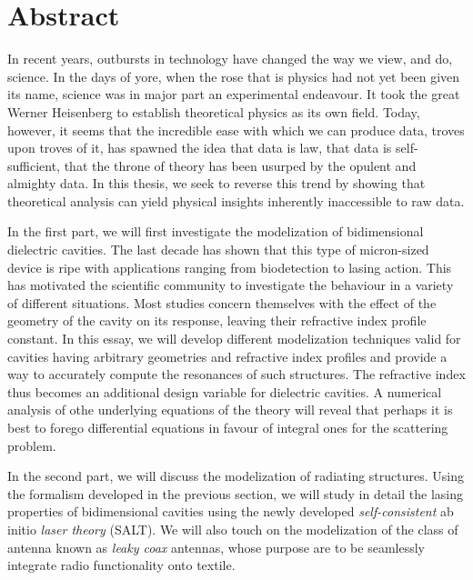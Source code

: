 \chapter*{Abstract}

In recent years, outbursts in technology have changed the way 
we view, and do, science. In the days of yore, when the rose
that is physics had not yet been given its name, science
was in major part an experimental endeavour. It took the great
Werner Heisenberg to establish theoretical physics as its own field. 
Today, however, it seems that the incredible ease with which we 
can produce data, troves upon troves of it, has spawned the idea
that data is law, that data is self-sufficient, that the throne of 
theory has been usurped by the opulent and almighty data. In this
thesis, we seek to reverse this trend by showing that theoretical 
analysis can yield physical insights inherently inaccessible to
raw data. 

In the first part, we will first investigate the modelization of bidimensional dielectric
cavities. The last decade has shown that this type of micron-sized device
is ripe with applications ranging from biodetection to lasing action. 
This has motivated the scientific community to investigate the behaviour in a
variety of different situations. Most studies concern themselves with the effect
of the geometry of the cavity on its response, leaving their refractive index
profile constant. In this essay, we will develop different modelization techniques valid 
for cavities having arbitrary geometries and refractive index profiles and provide
a way to accurately compute the resonances of such structures. The refractive
index thus becomes an additional design variable for dielectric cavities.
A numerical analysis of othe underlying equations of the theory will
reveal that perhaps it is best to forego differential equations 
in favour of integral ones for the scattering problem. 

In the second part, we will discuss the modelization of radiating structures. 
Using the formalism developed in the previous section, we will study in detail the 
lasing properties of bidimensional cavities using the newly developed
\textit{self-consistent} ab initio \textit{laser theory} (SALT). We will also
touch on the modelization of the class of antenna known as \textit{leaky coax} antennas, 
whose purpose are to be seamlessly integrate radio functionality onto textile.